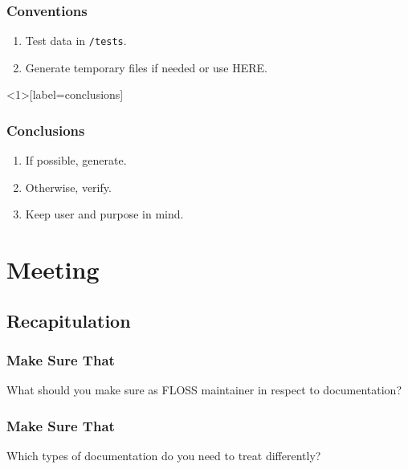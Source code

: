 \begin{frame}[fragile]
	\frametitle{Conventions}

	\begin{enumerate}[<+-| alert@+>]
	\item Test data in \verb+/tests+.
	\item Generate temporary files if needed or use HERE.
	\end{enumerate}
\end{frame}

\begin{frame}<1>[label=conclusions]
	\frametitle{Conclusions}

	\begin{enumerate}[<+-| alert@+>]
	\item If possible, generate.
	\item Otherwise, verify.
	\item Keep user and purpose in mind.
	\end{enumerate}
\end{frame}

\section{Meeting}

\subsection{Recapitulation}


\begin{frame}
	\frametitle{Make Sure That}

	\begin{task}
	What should you make sure as FLOSS maintainer in respect to documentation?
	\end{task}
\end{frame}


\begin{frame}
	\frametitle{Make Sure That}

	\begin{task}
	Which types of documentation do you need to treat differently?
	\end{task}
\end{frame}


